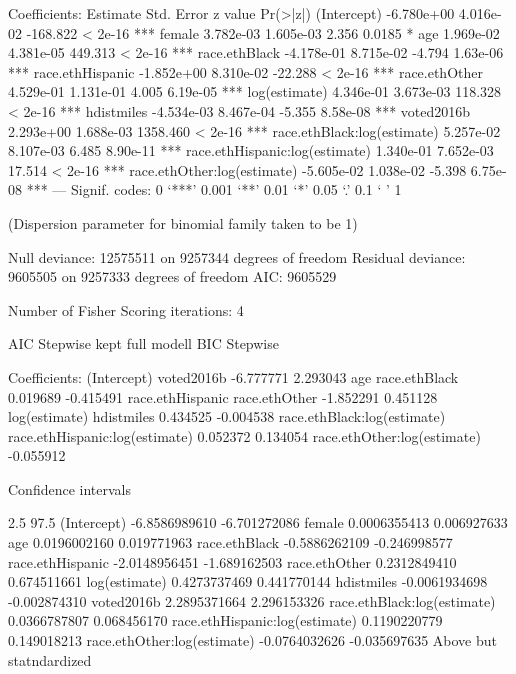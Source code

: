 Coefficients:
                                 Estimate Std. Error  z value Pr(>|z|)
(Intercept)                    -6.780e+00  4.016e-02 -168.822  < 2e-16 ***
female                          3.782e-03  1.605e-03    2.356   0.0185 *
age                             1.969e-02  4.381e-05  449.313  < 2e-16 ***
race.ethBlack                  -4.178e-01  8.715e-02   -4.794 1.63e-06 ***
race.ethHispanic               -1.852e+00  8.310e-02  -22.288  < 2e-16 ***
race.ethOther                   4.529e-01  1.131e-01    4.005 6.19e-05 ***
log(estimate)                   4.346e-01  3.673e-03  118.328  < 2e-16 ***
hdistmiles                     -4.534e-03  8.467e-04   -5.355 8.58e-08 ***
voted2016b                      2.293e+00  1.688e-03 1358.460  < 2e-16 ***
race.ethBlack:log(estimate)     5.257e-02  8.107e-03    6.485 8.90e-11 ***
race.ethHispanic:log(estimate)  1.340e-01  7.652e-03   17.514  < 2e-16 ***
race.ethOther:log(estimate)    -5.605e-02  1.038e-02   -5.398 6.75e-08 ***
---
Signif. codes:  0 ‘***’ 0.001 ‘**’ 0.01 ‘*’ 0.05 ‘.’ 0.1 ‘ ’ 1

(Dispersion parameter for binomial family taken to be 1)

    Null deviance: 12575511  on 9257344  degrees of freedom
Residual deviance:  9605505  on 9257333  degrees of freedom
AIC: 9605529

Number of Fisher Scoring iterations: 4

AIC Stepwise kept full modell
BIC Stepwise

Coefficients:
                   (Intercept)                      voted2016b
                     -6.777771                        2.293043
                           age                   race.ethBlack
                      0.019689                       -0.415491
              race.ethHispanic                   race.ethOther
                     -1.852291                        0.451128
                 log(estimate)                      hdistmiles
                      0.434525                       -0.004538
   race.ethBlack:log(estimate)  race.ethHispanic:log(estimate)
                      0.052372                        0.134054
   race.ethOther:log(estimate)
                     -0.055912


Confidence intervals

                                    2.5        97.5
(Intercept)                    -6.8586989610 -6.701272086
female                          0.0006355413  0.006927633
age                             0.0196002160  0.019771963
race.ethBlack                  -0.5886262109 -0.246998577
race.ethHispanic               -2.0148956451 -1.689162503
race.ethOther                   0.2312849410  0.674511661
log(estimate)                   0.4273737469  0.441770144
hdistmiles                     -0.0061934698 -0.002874310
voted2016b                      2.2895371664  2.296153326
race.ethBlack:log(estimate)     0.0366787807  0.068456170
race.ethHispanic:log(estimate)  0.1190220779  0.149018213
race.ethOther:log(estimate)    -0.0764032626 -0.035697635
Above but statndardized

